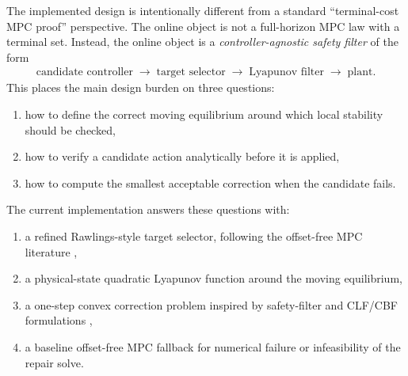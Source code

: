 \documentclass[11pt]{article}
\begin{document}
The implemented design is intentionally different from a standard ``terminal-cost MPC proof'' perspective. The online object is not a full-horizon MPC law with a terminal set. Instead, the online object is a \emph{controller-agnostic safety filter} of the form
\begin{align}
\text{candidate controller} \;\longrightarrow\; \text{target selector} \;\longrightarrow\; \text{Lyapunov filter} \;\longrightarrow\; \text{plant}.
\end{align}
This places the main design burden on three questions:
\begin{enumerate}[leftmargin=*]
\item how to define the correct moving equilibrium around which local stability should be checked,
\item how to verify a candidate action analytically before it is applied,
\item how to compute the smallest acceptable correction when the candidate fails.
\end{enumerate}
The current implementation answers these questions with:
\begin{enumerate}[leftmargin=*]
\item a refined Rawlings-style target selector, following the offset-free MPC literature \cite{pannocchia2003,pannocchia2007,limon2008,maeder2010},
\item a physical-state quadratic Lyapunov function around the moving equilibrium,
\item a one-step convex correction problem inspired by safety-filter and CLF/CBF formulations \cite{ames2014,ames2017,wabersich2021},
\item a baseline offset-free MPC fallback for numerical failure or infeasibility of the repair solve.
\end{enumerate}
\end{document}
